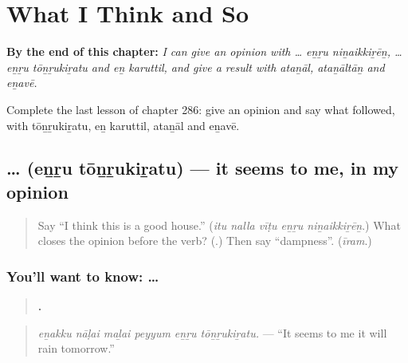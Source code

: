 
\chapter{What I Think and So}
\label{ch:ta-what-i-think-and-so}

\begin{chapteropening}
\textbf{By the end of this chapter:} \emph{I can give an opinion with … eṉṟu niṉaikkiṟēṉ, … eṉṟu tōṉṟukiṟatu and eṉ karuttil, and give a result with ataṉāl, ataṉāltāṉ and eṉavē.}

Complete the last lesson of chapter 286: give an opinion and say what followed, with tōṉṟukiṟatu, eṉ karuttil, ataṉāl and eṉavē.
\end{chapteropening}

\section[\texorpdfstring{… \ta{என்று} \ta{தோன்றுகிறது} (… eṉṟu tōṉṟukiṟatu)}{… என்று தோன்றுகிறது (… eṉṟu tōṉṟukiṟatu)}]{…   (eṉṟu tōṉṟukiṟatu) — it seems to me, in my opinion}

\label{lesson:TA-C286-tonrukiratu}



\begin{quote}
Say \textquotedblleft{}I think this is a good house.\textquotedblright{} (\emph{itu nalla vīṭu eṉṟu niṉaikkiṟēṉ}.) What closes the opinion before the verb? (\textbf{}.) Then say \textquotedblleft{}dampness\textquotedblright{}. (\emph{īram}.)
\end{quote}

\subsection*{You'll want to know: …  }
\begin{quote}
\textbf{     .}
\end{quote}

\begin{quote}
\emph{eṉakku nāḷai maḻai peyyum eṉṟu tōṉṟukiṟatu.} — \textquotedblleft{}It seems to me it will rain tomorrow.\textquotedblright{}
\end{quote}

